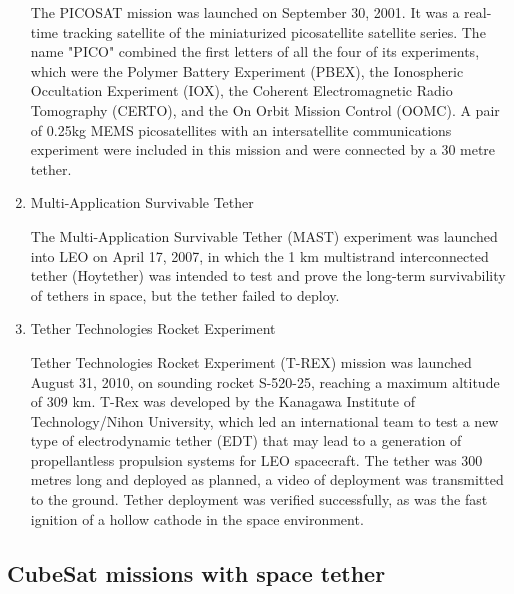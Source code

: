 \begin{enumerate}
The PICOSAT mission was launched on September 30, 2001. It was a real-time tracking satellite of the miniaturized picosatellite satellite series. The name "PICO" combined the first letters of all the four of its experiments, which were the Polymer Battery Experiment (PBEX), the Ionospheric Occultation Experiment (IOX), the Coherent Electromagnetic Radio Tomography (CERTO), and the On Orbit Mission Control (OOMC). A pair of 0.25kg MEMS picosatellites with an intersatellite communications experiment were included in this mission and were connected by a 30 metre tether.

\item{Multi-Application Survivable Tether}

The Multi-Application Survivable Tether (MAST) experiment was launched into LEO on April 17, 2007, in which the 1 km multistrand interconnected tether (Hoytether) was intended to test and prove the long-term survivability of tethers in space, but the tether failed to deploy. 
\item{Tether Technologies Rocket Experiment}

Tether Technologies Rocket Experiment (T-REX) mission was launched August 31, 2010, on sounding rocket S-520-25, reaching a maximum altitude of 309 km. T-Rex was developed by the Kanagawa Institute of Technology/Nihon University, which led an international team to test a new type of electrodynamic tether (EDT) that may lead to a generation of propellantless propulsion systems for LEO spacecraft. The tether was 300 metres long and deployed as planned, a video of deployment was transmitted to the ground. Tether deployment was verified successfully, as was the fast ignition of a hollow cathode in the space environment.
\end{enumerate} 

\subsection{CubeSat missions with space tether}

